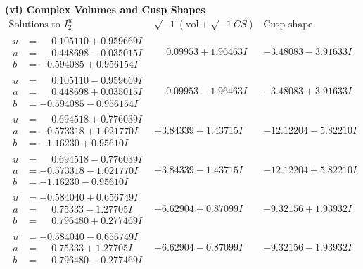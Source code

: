 \documentclass[1p]{elsarticle_modified}
\theoremstyle{definition}
\newcommand{\I}{\sqrt{-1}}
\begin{document}
\newpage\flushleft \textbf{(vi) Complex Volumes and Cusp Shapes}
$$\begin{array}{c|c|c}  
\text{Solutions to }I^u_{2}& \I (\text{vol} + \sqrt{-1}CS) & \text{Cusp shape}\\
 \hline 
\begin{aligned}
u &= \phantom{-}0.105110 + 0.959669 I \\
a &= \phantom{-}0.448698 - 0.035015 I \\
b &= -0.594085 + 0.956154 I\end{aligned}
 & \phantom{-}0.09953 + 1.96463 I & -3.48083 - 3.91633 I \\ \hline\begin{aligned}
u &= \phantom{-}0.105110 - 0.959669 I \\
a &= \phantom{-}0.448698 + 0.035015 I \\
b &= -0.594085 - 0.956154 I\end{aligned}
 & \phantom{-}0.09953 - 1.96463 I & -3.48083 + 3.91633 I \\ \hline\begin{aligned}
u &= \phantom{-}0.694518 + 0.776039 I \\
a &= -0.573318 + 1.021770 I \\
b &= -1.16230 + 0.95610 I\end{aligned}
 & -3.84339 + 1.43715 I & -12.12204 - 5.82210 I \\ \hline\begin{aligned}
u &= \phantom{-}0.694518 - 0.776039 I \\
a &= -0.573318 - 1.021770 I \\
b &= -1.16230 - 0.95610 I\end{aligned}
 & -3.84339 - 1.43715 I & -12.12204 + 5.82210 I \\ \hline\begin{aligned}
u &= -0.584040 + 0.656749 I \\
a &= \phantom{-}0.75333 - 1.27705 I \\
b &= \phantom{-}0.796480 + 0.277469 I\end{aligned}
 & -6.62904 + 0.87099 I & -9.32156 + 1.93932 I \\ \hline\begin{aligned}
u &= -0.584040 - 0.656749 I \\
a &= \phantom{-}0.75333 + 1.27705 I \\
b &= \phantom{-}0.796480 - 0.277469 I\end{aligned}
 & -6.62904 - 0.87099 I & -9.32156 - 1.93932 I \\ \hline\begin{aligned}

\end{aligned}
\end{array}$$
\end{document}
